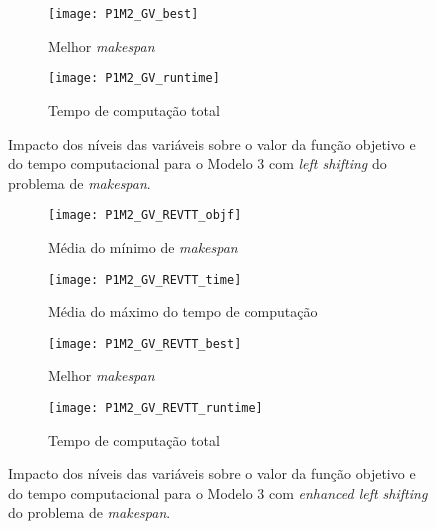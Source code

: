 \begin{figure}[H]
	\centering
	\begin{subfigure}{0.49\textwidth}
	\centering
		\texttt{[image: P1M2\_GV\_best]}
		\caption{Melhor \textit{makespan}}
		\label{fig:P1M2_GV_best}
	\end{subfigure}
	\begin{subfigure}{0.49\textwidth}
	\centering
		\texttt{[image: P1M2\_GV\_runtime]}
		\caption{Tempo de computação total}
		\label{fig:P1M2_GV_runtime}
	\end{subfigure}
	\caption{Impacto dos níveis das variáveis sobre o valor da função objetivo e do tempo computacional para o Modelo 3 com \textit{left shifting} do problema de \textit{makespan}.}
	\label{fig:P1M2_GV_alt}
\end{figure}

\begin{figure}[H]
	\centering
	\begin{subfigure}{0.49\textwidth}
	\centering
		\texttt{[image: P1M2\_GV\_REVTT\_objf]}
		\caption{Média do mínimo de \textit{makespan}}
		\label{fig:P1M2_GV_REVTT_objf}
	\end{subfigure}
	\begin{subfigure}{0.49\textwidth}
	\centering
		\texttt{[image: P1M2\_GV\_REVTT\_time]}
		\caption{Média do máximo do tempo de computação}
		\label{fig:P1M2_GV_REVTT_time}
	\end{subfigure}
	\label{fig:P1M2_GV_REVTT_alt}
	\centering
	\begin{subfigure}{0.49\textwidth}
	\centering
		\texttt{[image: P1M2\_GV\_REVTT\_best]}
		\caption{Melhor \textit{makespan}}
		\label{fig:P1M2_GV_REVTT_best}
	\end{subfigure}
	\begin{subfigure}{0.49\textwidth}
	\centering
		\texttt{[image: P1M2\_GV\_REVTT\_runtime]}
		\caption{Tempo de computação total}
		\label{fig:P1M2_GV_REVTT_runtime}
	\end{subfigure}
	\caption{Impacto dos níveis das variáveis sobre o valor da função objetivo e do tempo computacional para o Modelo 3 com \textit{enhanced left shifting} do problema de \textit{makespan}.}
	\label{fig:P1M2_GV_REVTT_alt}
\end{figure}

